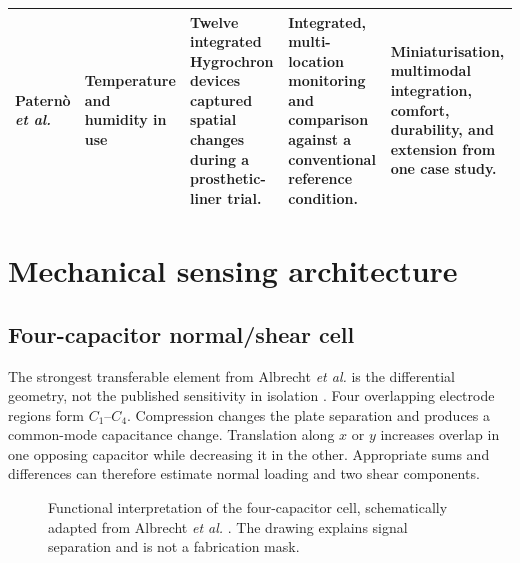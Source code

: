 \documentclass[10pt,twocolumn]{article}
\begin{document}
\begin{table}[t]
\begin{tabularx}{\textwidth}{@{}p{}p{}
X X X@{}}
Paternò \textit{et al.} \cite{paterno2020} &
Temperature and humidity in use &
Twelve integrated Hygrochron devices captured spatial changes during a
prosthetic-liner trial. &
Integrated, multi-location monitoring and comparison against a conventional
reference condition. &
Miniaturisation, multimodal integration, comfort, durability, and extension
from one case study. \\
\bottomrule
\end{tabularx}
\end{table}

\section{Mechanical sensing architecture}

\subsection{Four-capacitor normal/shear cell}

The strongest transferable element from Albrecht \textit{et al.} is the
differential geometry, not the published sensitivity in isolation
\cite{albrecht2019}. Four overlapping electrode regions form
\(C_1\)--\(C_4\). Compression changes the plate separation and produces a
common-mode capacitance change. Translation along \(x\) or \(y\) increases
overlap in one opposing capacitor while decreasing it in the other. Appropriate
sums and differences can therefore estimate normal loading and two shear
components.

\begin{figure}[htbp]
\centering
{}
\caption{Functional interpretation of the four-capacitor cell, schematically
adapted from Albrecht \textit{et al.} \cite{albrecht2019}. The drawing explains
signal separation and is not a fabrication mask.}
\label{fig:shear}
\end{figure}
\end{document}
